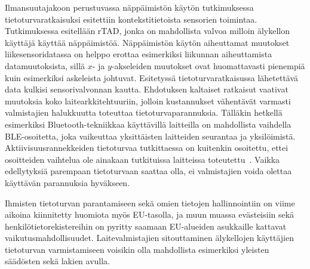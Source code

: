 \documentclass[finnish]{tktltiki2}
\theoremstyle{definition}
\theoremstyle{remark}
\begin{document}
Ilmansuutajakoon perustuvassa näppäimistön käytön tutkimuksessa~\cite{maiti} tietoturvaratkaisuksi esitettiin kontekstitietoista sensorien toimintaa. Tutkimuksessa esitellään rTAD, jonka on mahdollista valvoa milloin älykellon käyttäjä käyttää näppäimistöä. Näppäimistön käytön aiheuttamat muutokset liikesensoridatassa on helppo erottaa esimerkiksi liikunnan aiheuttamista datamuutoksista, sillä $x$- ja $y$-akseleiden muutokset ovat huomattavasti pienempiä kuin esimerkiksi askeleista johtuvat. Esitetyssä tietoturvaratkaisussa lähetettävä data kulkisi sensorivalvonnan kautta. Ehdotuksen kaltaiset ratkaisut vaativat muutoksia koko laitearkkitehtuuriin, jolloin kustannukset vähentävät varmasti valmistajien halukkuutta toteuttaa tietoturvaparannuksia. Tälläkin hetkellä esimerkiksi Bluetooth-tekniikkaa käyttävillä laitteilla on mahdollista vaihdella BLE-osoitetta, joka vaikeuttaa yksittäisten laitteiden seurantaa ja yksilöimistä. Aktiivisuusrannekkeiden tietoturvaa tutkittaessa on kuitenkin osoitettu, ettei osoitteiden vaihtelua ole ainakaan tutkituissa laitteissa toteutettu~\cite{das}. Vaikka edellytyksiä parempaan tietoturvaan saattaa olla, ei valmistajien voida olettaa käyttävän parannuksia hyväkseen.

Ihmisten tietoturvan parantamiseen sekä omien tietojen hallinnointiin on viime aikoina kiinnitetty huomiota myös EU-tasolla, ja muun muassa evästeisiin sekä henkilötietorekistereihin on pyritty saamaan EU-alueiden asukkaille kattavat vaikutusmahdollisuudet. Laitevalmistajien sitouttaminen älykellojen käyttäjien tietoturvan varmistamiseen voisikin olla mahdollista esimerkiksi yleisten säädösten sekä lakien avulla.



\end{document}
